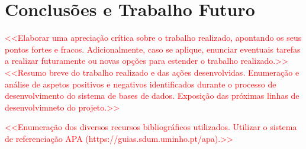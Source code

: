 \documentclass[a4paper,12pt]{scrreprt}
\begin{document}
\chapter{Conclusões e Trabalho Futuro}
    \textcolor{red}{
        <<Elaborar uma apreciação crítica sobre o trabalho realizado, apontando os seus pontos fortes e fracos. Adicionalmente, caso se aplique, enunciar eventuais tarefas a realizar futuramente ou novas opções para estender o trabalho realizado.>> \\
        <<Resumo breve do trabalho realizado e das ações desenvolvidas. Enumeração e análise de aspetos positivos e negativos identificados durante o processo de desenvolvimento do sistema de bases de dados. Exposição das próximas linhas de desenvolvimneto do projeto.>>
    }




\begin{thebibliography}{9}
\textcolor{red}{
    <<Enumeração dos diversos recursos bibliográficos utilizados. Utilizar o sistema de referenciação APA (https://guias.sdum.uminho.pt/apa).>>
}
\end{thebibliography}



\renewcommand{\nomname}{Lista de Siglas e Acrónimos}

\end{document}

